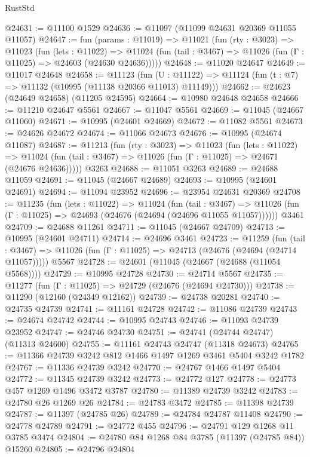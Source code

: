 \begin{lexlean}{RustStd}
\begin{coremodule}
@24631 := @11100 @1529
@24636 := @11097 (@11099 @24631 @20369 @11055 @11057)
@24647 := fun (params : @11019) =>
  @11021
    (fun (rty : @3023) =>
    @11023
      (fun (lets : @11022) =>
      @11024 (fun (tail : @3467) => @11026 (fun (Γ : @11025) => @24603 (@24630 @24636)))))
@24648 := @11020 @24647
@24649 := @11017 @24648
@24658 := @11123
    (fun (U : @11122) => @11124 (fun (t : @7) => @11132 (@10995 (@11138 @20366 @11013) @11149)))
@24662 := @24623 (@24649 @24658) (@11205 @24595)
@24664 := @10980 @24648 @24658
@24666 := @11210 @24647 @5561
@24667 := @11047 @5561
@24669 := @11045 (@24667 @11060)
@24671 := @10995 (@24601 @24669)
@24672 := @11082 @5561
@24673 := @24626 @24672
@24674 := @11066 @24673
@24676 := @10995 (@24674 @11087)
@24687 := @11213
    (fun (rty : @3023) =>
    @11023
      (fun (lets : @11022) =>
      @11024 (fun (tail : @3467) => @11026 (fun (Γ : @11025) => @24671 (@24676 @24636)))))
    @3263
@24688 := @11051 @3263
@24689 := @24688 @11059
@24691 := @11045 (@24667 @24689)
@24693 := @10995 (@24601 @24691)
@24694 := @11094 @23952
@24696 := @23954 @24631 @20369
@24708 := @11235
    (fun (lets : @11022) =>
    @11024
      (fun (tail : @3467) =>
      @11026 (fun (Γ : @11025) => @24693 (@24676 (@24694 (@24696 @11055 @11057))))))
    @3461
@24709 := @24688 @11261
@24711 := @11045 (@24667 @24709)
@24713 := @10995 (@24601 @24711)
@24714 := @24696 @3461
@24723 := @11259
    (fun (tail : @3467) => @11026 (fun (Γ : @11025) => @24713 (@24676 (@24694 (@24714 @11057)))))
    @5567
@24728 := @24601 (@11045 (@24667 (@24688 (@11054 @5568))))
@24729 := @10995 @24728
@24730 := @24714 @5567
@24735 := @11277 (fun (Γ : @11025) => @24729 (@24676 (@24694 @24730)))
@24738 := @11290 (@12160 (@24349 @12162))
@24739 := @24738 @20281
@24740 := @24735 @24739
@24741 := @11161 @24728
@24742 := @11086 @24739
@24743 := @24674 @24742
@24744 := @10995 @24743
@24746 := @11093 @24739 @23952
@24747 := @24746 @24730
@24751 := @24741 (@24744 @24747) (@11313 @24600)
@24755 := @11161 @24743 @24747 (@11318 @24673)
@24765 := @11366 @24739 @3242 @812 @1466 @1497 @1269 @3461 @5404 @3242 @1782
@24767 := @11336 @24739 @3242
@24770 := @24767 @1466 @1497 @5404
@24772 := @11345 @24739 @3242
@24773 := @24772 @127
@24778 := @24773 @457 @1269 @1496 @3472 @3787
@24780 := @11389 @24739 @3242
@24783 := @24780 @26 @1269 @26
@24784 := @24783 @3472
@24785 := @11398 @24739
@24787 := @11397 (@24785 @26)
@24789 := @24784 @24787 @11408
@24790 := @24778 @24789
@24791 := @24772 @455
@24796 := @24791 @129 @1268 @11 @3785 @3474
@24804 := @24780 @84 @1268 @84 @3785 (@11397 (@24785 @84)) @15260
@24805 := @24796 @24804

\end{coremodule}
\end{lexlean}
